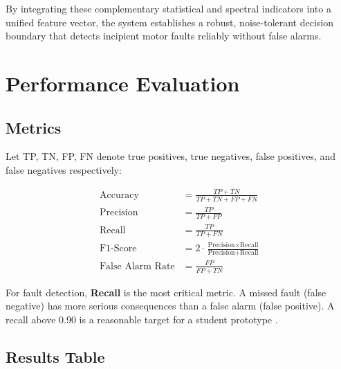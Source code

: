 \documentclass[12pt,a4paper]{article}
\begin{document}
By integrating these complementary statistical and spectral indicators into a
unified feature vector, the system establishes a robust, noise-tolerant decision
boundary that detects incipient motor faults reliably without false alarms.

\section{Performance Evaluation}

\subsection{Metrics}

Let TP, TN, FP, FN denote true positives, true negatives, false
positives, and false negatives respectively:

\begin{align}
  \text{Accuracy}   &= \frac{TP + TN}{TP + TN + FP + FN}
                     \label{eq:acc}\\[6pt]
  \text{Precision}  &= \frac{TP}{TP + FP}
                     \label{eq:prec}\\[6pt]
  \text{Recall}     &= \frac{TP}{TP + FN}
                     \label{eq:rec}\\[6pt]
  \text{F1-Score}   &= 2 \cdot
                     \frac{\text{Precision} \times \text{Recall}}
                          {\text{Precision} + \text{Recall}}
                     \label{eq:f1}\\[6pt]
  \text{False Alarm Rate} &= \frac{FP}{FP + TN}
                     \label{eq:far}
\end{align}

For fault detection, \textbf{Recall} is the most critical metric.
A missed fault (false negative) has more serious consequences than
a false alarm (false positive). A recall above 0.90 is a
reasonable target for a student prototype \cite{lei2020}.

\subsection{Results Table}
\end{document}

